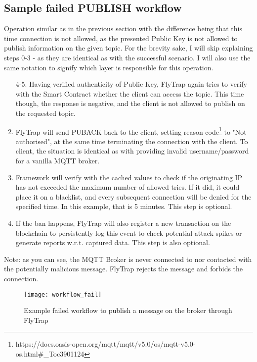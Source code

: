 \subsection{Sample failed PUBLISH workflow}
Operation similar as in the previous section with the difference being that this time connection is not allowed, as the presented Public Key is not allowed to publish information on the given topic. For the brevity sake, I will skip explaining steps 0-3 - as they are identical as with the successful scenario. I will also use the same notation to signify which layer is responsible for this operation.

\begin{enumerate}\addtocounter{enumi}{4}
    \item[4-5.] Having verified authenticity of Public Key, FlyTrap again tries to verify with the Smart Contract whether the client can access the topic. This time though, the response is negative, and the client is not allowed to publish on the requested topic.
    \item FlyTrap will send PUBACK back to the client, setting reason code\footnote{https://docs.oasis-open.org/mqtt/mqtt/v5.0/os/mqtt-v5.0-os.html\#\_Toc3901124} to "Not authorised", at the same time terminating the connection with the client. To client, the situation is identical as with providing invalid username/password for a vanilla MQTT broker.
    \item Framework will verify with the cached values to check if the originating IP has not exceeded the maximum number of allowed tries. If it did, it could place it on a blacklist, and every subsequent connection will be denied for the specified time. In this example, that is 5 minutes. This step is optional.
    \item If the ban happens, FlyTrap will also register a new transaction on the blockchain to persistently log this event to check potential attack spikes or generate reports w.r.t.  captured data. This step is also optional.
\end{enumerate}

Note: as you can see, the MQTT Broker is never connected to nor contacted with the potentially malicious message. FlyTrap rejects the message and forbids the connection. 
\begin{figure}[h]
    \centering
    \texttt{[image: workflow\_fail]}
    \caption{Example failed workflow to publish a message on the broker through FlyTrap}
    \label{fig:workflow_fail}
\end{figure}

